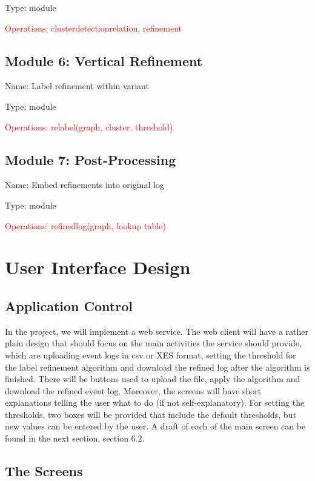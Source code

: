 \documentclass[notitlepage]{article}
\begin{document}
\begin{flushleft}
Type: module

\textcolor{red}{Operations: clusterdetectionrelation, refinement}

\subsection{Module 6: Vertical Refinement}
Name: Label refinement within variant

Type: module

\textcolor{red}{Operations: relabel(graph, cluster, threshold)}



\subsection{Module 7: Post-Processing}
Name: Embed refinements into original log 

Type: module

\textcolor{red}{Operations: refinedlog(graph, lookup table)}










\section{User Interface Design}
\subsection{Application Control}

In the project, we will implement a web service. The web client will have a rather plain design that should focus on the main activities the service should provide, which are uploading event logs in csv or XES format, setting the threshold for the label refinement algorithm and download the refined log after the algorithm is finished. There will be buttons used to upload the file, apply the algorithm and download the refined event log. Moreover, the screens will have short explanations telling the user what to do (if not self-explanatory). For setting the thresholds, two boxes will be provided that include the default thresholds, but new values can be entered by the user. A draft of each of the main screen can be found in the next section, section 6.2.

\subsection{The Screens}


\end{flushleft}
\end{document}
